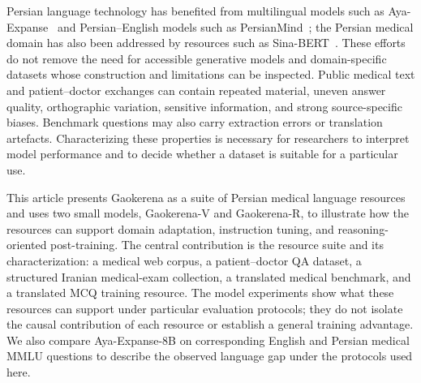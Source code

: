 \documentclass[manuscript,screen,review]{acmart}
\begin{document}
Persian language technology has benefited from multilingual models such as Aya-Expanse~\cite{b12,b13} and Persian--English models such as PersianMind~\cite{b14}; the Persian medical domain has also been addressed by resources such as Sina-BERT~\cite{b6}. These efforts do not remove the need for accessible generative models and domain-specific datasets whose construction and limitations can be inspected. Public medical text and patient--doctor exchanges can contain repeated material, uneven answer quality, orthographic variation, sensitive information, and strong source-specific biases. Benchmark questions may also carry extraction errors or translation artefacts. Characterizing these properties is necessary for researchers to interpret model performance and to decide whether a dataset is suitable for a particular use.

This article presents Gaokerena as a suite of Persian medical language resources and uses two small models, Gaokerena-V and Gaokerena-R, to illustrate how the resources can support domain adaptation, instruction tuning, and reasoning-oriented post-training. The central contribution is the resource suite and its characterization: a medical web corpus, a patient--doctor QA dataset, a structured Iranian medical-exam collection, a translated medical benchmark, and a translated MCQ training resource. The model experiments show what these resources can support under particular evaluation protocols; they do not isolate the causal contribution of each resource or establish a general training advantage. We also compare Aya-Expanse-8B on corresponding English and Persian medical MMLU questions to describe the observed language gap under the protocols used here.
\end{document}
